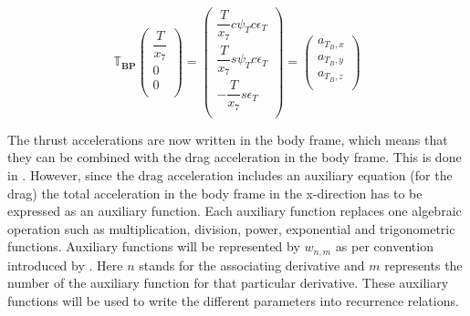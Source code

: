 \begin{equation} \label{eq:aTB}
\mathbb{T}_{\mathbf{BP}}
\begin{pmatrix}
\dfrac{T}{x_{7}}\\
0\\
0\\
\end{pmatrix}
=
\begin{pmatrix}
\dfrac{T}{x_{7}}c\psi_{T}c\epsilon_{T}\\
\dfrac{T}{x_{7}}s\psi_{T}c\epsilon_{T}\\
-\dfrac{T}{x_{7}}s\epsilon_{T}\\
\end{pmatrix}
=
\begin{pmatrix}
a_{T_{B},x}\\
a_{T_{B},y}\\
a_{T_{B},z}\\
\end{pmatrix}
\end{equation}


The thrust accelerations are now written in the body frame, which means that they can be combined with the drag acceleration in the body frame. This is done in . However, since the drag acceleration includes an auxiliary equation (for the drag) the total acceleration in the body frame in the x-direction has to be expressed as an auxiliary function. Each auxiliary function replaces one algebraic operation such as multiplication, division, power, exponential and trigonometric functions. Auxiliary functions will be represented by $w_{n,m}$ as per convention introduced by \cite{scott2008high}. Here $n$ stands for the associating derivative and $m$ represents the number of the auxiliary function for that particular derivative. These auxiliary functions will be used to write the different parameters into recurrence relations.

